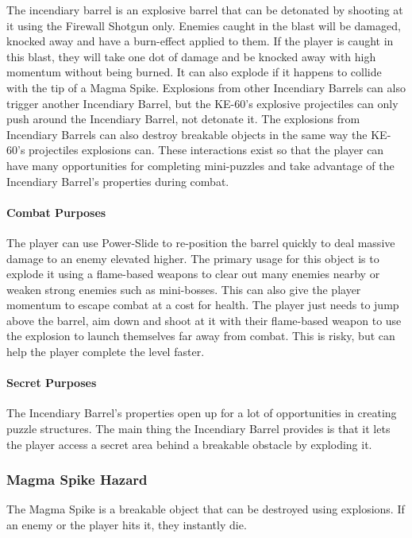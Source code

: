 \documentclass[12pt]{article}
\begin{document}
The incendiary barrel is an explosive barrel that can be detonated by shooting at it using the Firewall Shotgun only. Enemies caught in the blast will be damaged, knocked away and have a burn-effect applied to them. If the player is caught in this blast, they will take one dot of damage and be knocked away with high momentum without being burned. It can also explode if it happens to collide with the tip of a Magma Spike. Explosions from other Incendiary Barrels can also trigger another Incendiary Barrel, but the KE-60's explosive projectiles can only push around the Incendiary Barrel, not detonate it. The explosions from Incendiary Barrels can also destroy breakable objects in the same way the KE-60's projectiles explosions can. These interactions exist so that the player can have many opportunities for completing mini-puzzles and take advantage of the Incendiary Barrel's properties during combat. 

\paragraph{Combat Purposes}

The player can use Power-Slide to re-position the barrel quickly to deal massive damage to an enemy elevated higher. The primary usage for this object is to explode it using a flame-based weapons to clear out many enemies nearby or weaken strong enemies such as mini-bosses. This can also give the player momentum to escape combat at a cost for health. The player just needs to jump above the barrel, aim down and shoot at it with their flame-based weapon to use the explosion to launch themselves far away from combat. This is risky, but can help the player complete the level faster. 

\paragraph{Secret Purposes}

The Incendiary Barrel's properties open up for a lot of opportunities in creating puzzle structures. The main thing the Incendiary Barrel provides is that it lets the player access a secret area behind a breakable obstacle by exploding it. 

\subsubsection{Magma Spike Hazard}

The Magma Spike is a breakable object that can be destroyed using explosions. If an enemy or the player hits it, they instantly die. 
\end{document}
